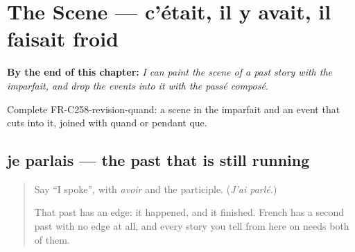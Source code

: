 
\chapter{The Scene — c'était, il y avait, il faisait froid}
\label{ch:fr-the-scene}

\begin{chapteropening}
\textbf{By the end of this chapter:} \emph{I can paint the scene of a past story with the imparfait, and drop the events into it with the passé composé.}

Complete FR-C258-revision-quand: a scene in the imparfait and an event that cuts into it, joined with quand or pendant que.
\end{chapteropening}

\section[je parlais, il parlait]{je parlais — the past that is still running}

\label{lesson:FR-C258-parlais}



\begin{quote}
Say \textquotedblleft{}I spoke\textquotedblright{}, with \emph{avoir} and the participle. (\emph{J'ai parlé.})

That past has an edge: it happened, and it finished. French has a second past with no edge at all, and every story you tell from here on needs both of them.
\end{quote}

